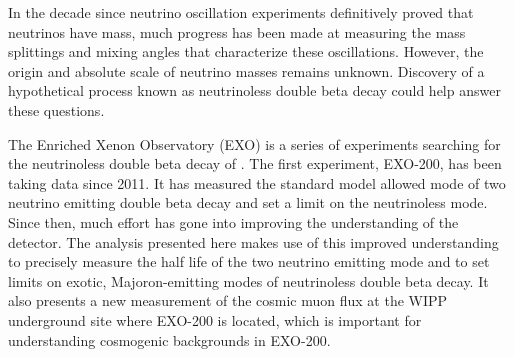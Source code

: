 In the decade since neutrino oscillation experiments definitively proved that neutrinos have mass, much progress has been made at measuring the mass splittings and mixing angles that characterize these oscillations. However, the origin and absolute scale of neutrino masses remains unknown. Discovery of a hypothetical process known as neutrinoless double beta decay could help answer these questions.

The Enriched Xenon Observatory (EXO) is a series of experiments searching for the neutrinoless double beta decay of . The first experiment, EXO-200, has been taking data since 2011. It has measured the standard model allowed mode of two neutrino emitting double beta decay and set a limit on the neutrinoless mode. Since then, much effort has gone into improving the understanding of the detector. The analysis presented here makes use of this improved understanding to precisely measure the half life of the two neutrino emitting mode and to set limits on exotic, Majoron-emitting modes of neutrinoless double beta decay. It also presents a new measurement of the cosmic muon flux at the WIPP underground site where EXO-200 is located, which is important for understanding cosmogenic backgrounds in EXO-200.

